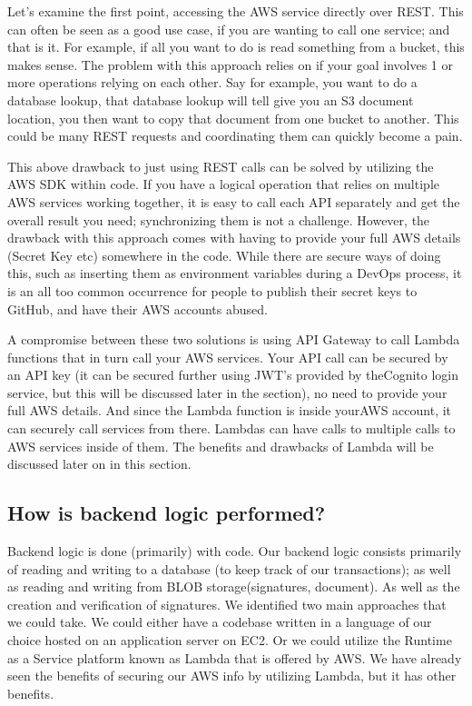 \documentclass[runningheads]{llncs}
\begin{document}
Let's examine the first point, accessing the AWS service directly over REST. This can often be seen as a good use case, if you are wanting to call one service; and that is it. For example, if all you want to do is read something from a bucket, this makes sense. The problem with this approach relies on if your goal involves 1 or more operations relying on each other. Say for example, you want to do a database lookup, that database lookup will tell give you an S3 document location, you then want to copy that document from one bucket to another. This could be many REST requests and coordinating them can quickly become a pain.

This above drawback to just using REST calls can be solved by utilizing the AWS SDK within code. If you have a logical operation that relies on multiple AWS services working together, it is easy to call each API separately and get the overall result you need; synchronizing them is not a challenge. However, the drawback with this approach comes with having to provide your full AWS details (Secret Key etc) somewhere in the code. While there are secure ways of doing this, such as inserting them as environment variables during a DevOps process, it is an all too common occurrence for people to publish their secret keys to GitHub, and have their AWS accounts abused.

A compromise between these two solutions is using API Gateway to call Lambda functions that in turn call your AWS services. Your API call can be secured by an API  key (it can be secured further using JWT's provided by theCognito login service, but this will be discussed later in the section), no need to provide your full AWS details. And since the Lambda function is inside yourAWS account, it can securely call services from there. Lambdas can have calls to multiple calls to AWS services inside of them. The benefits and drawbacks of Lambda will be discussed later on in this section.

\subsection{How is backend logic performed?}
Backend logic is done (primarily) with code. Our backend logic consists primarily of reading and writing to a database (to keep track of our transactions); as well as reading and writing from BLOB storage(signatures, document). As well as the creation and verification of signatures. We identified two main approaches that we could take. We could either have a codebase written in a language of our choice hosted on an application server on EC2. Or we could utilize the Runtime as a Service platform known as Lambda that is offered by AWS. We have already seen the benefits of securing our AWS info by utilizing Lambda, but it has other benefits.
\end{document}
